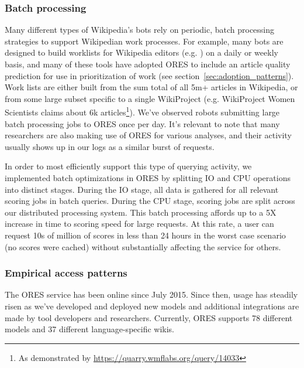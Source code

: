 \subsubsection{Batch processing}
Many different types of Wikipedia's bots rely on periodic, batch processing strategies to support Wikipedian work processes\cite{geiger2011lives}.  For example, many bots are designed to build worklists for Wikipedia editors (e.g. \cite{cosley2007suggestbot}) on a daily or weekly basis, and many of these tools have adopted ORES to include an article quality prediction for use in prioritization of work (see section~\ref{sec:adoption_patterns}).  Work lists are either built from the sum total of all 5m+ articles in Wikipedia, or from some large subset specific to a single WikiProject (e.g. WikiProject Women Scientists claims about 6k articles\footnote{As demonstrated by \url{https://quarry.wmflabs.org/query/14033}}).  We've observed robots submitting large batch processing jobs to ORES once per day.  It's relevant to note that many researchers are also making use of ORES for various analyses, and their activity usually shows up in our logs as a similar burst of requests.

In order to most efficiently support this type of querying activity, we implemented batch optimizations in ORES by splitting IO and CPU operations into distinct stages.  During the IO stage, all data is gathered for all relevant scoring jobs in batch queries.  During the CPU stage, scoring jobs are split across our distributed processing system.  This batch processing affords up to a 5X increase in time to scoring speed for large requests\cite{sarabadani2017building}.  At this rate, a user can request 10s of million of scores in less than 24 hours in the worst case scenario (no scores were cached) without substantially affecting the service for others.

\subsubsection{Empirical access patterns}
\label{sec:appendix.empirical_access_patterns}


The ORES service has been online since July 2015\cite{halfaker2015artificial}.  Since then, usage has steadily risen as we've developed and deployed new models and additional integrations are made by tool developers and researchers.  Currently, ORES supports 78 different models and 37 different language-specific wikis.

